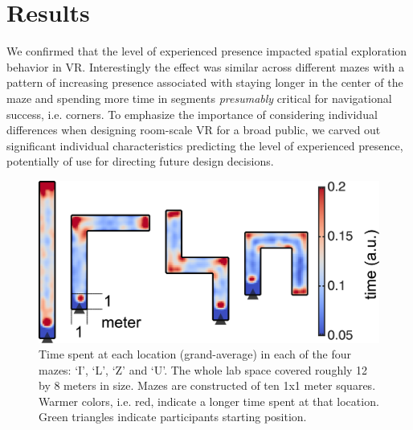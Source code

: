 \section{Results}
We confirmed that the level of experienced presence impacted spatial exploration behavior in VR. Interestingly the effect was similar across different mazes with a pattern of increasing presence associated with staying longer in the center of the maze and spending more time in segments \textit{presumably} critical for navigational success, i.e. corners. To emphasize the importance of considering individual differences when designing room-scale VR for a broad public, we carved out significant individual characteristics predicting the level of experienced presence, potentially of use for directing future design decisions.

\begin{figure}[h]
\centering
\includegraphics[width=\linewidth]{figures/head_loc_mean.pdf}
\caption{Time spent at each location (grand-average) in each of the four mazes: `I', `L', `Z' and `U'. The whole lab space covered roughly 12 by 8 meters in size. Mazes are constructed of ten 1x1 meter squares. Warmer colors, i.e. red, indicate a longer time spent at that location. Green triangles indicate participants starting position.}
\label{head_loc_mean}
\end{figure}